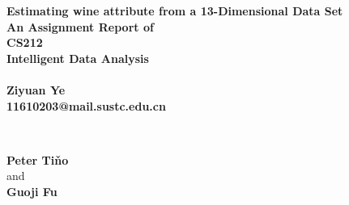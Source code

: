 \documentclass[titlepage,a4paper,12pt,thmsb]{report}
\begin{document}
\begin{titlepage}
\thispagestyle{empty}
\begin{center}
{\LARGE \bf{ Estimating wine attribute from a 13-Dimensional
Data Set}} \\
\vspace{2.0cm}
\large \bf{An Assignment Report of } \\
\large \bf{CS212\\ Intelligent Data Analysis} \\
\vspace{0.3cm}
\large {} \\
\vspace{0.3cm}
\rm
{\large \bf {Ziyuan Ye}}\\
\vspace{0.5cm}
\bf{11610203@mail.sustc.edu.cn} \\

\vspace{1cm}

{\large{}} \\
\vspace{.5cm}

\hspace{.05cm} {\bf {Peter Ti\v{n}o}}\\
\hspace{.05cm} {\sc and}\\
\hspace{.05cm} {\bf {Guoji Fu}}\\
\vspace{0.5cm}
\vspace{0.5cm}

\begin{figure}[h]
{\par}
\end{figure}


\end{center}
\end{titlepage}
\end{document}
